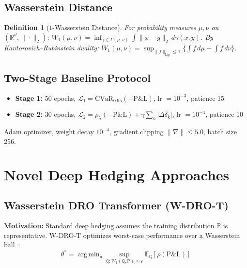 \documentclass[11pt]{article}
\newtheorem{definition}[theorem]{Definition}
\newcommand{\E}{\mathbb{E}}
\newcommand{\R}{\mathbb{R}}
\newcommand{\PP}{\mathbb{P}}
\newcommand{\QQ}{\mathbb{Q}}
\newcommand{\cvar}{\mathrm{CVaR}}
\DeclareMathOperator*{\argmin}{arg\,min}
\begin{document}
\subsection{Wasserstein Distance}

\begin{definition}[$1$-Wasserstein Distance]
For probability measures $\mu, \nu$ on $(\R^d, \|\cdot\|_2)$:
$W_1(\mu,\nu) = \inf_{\gamma \in \Gamma(\mu,\nu)} \int \|x-y\|_2\,d\gamma(x,y)$.
By Kantorovich--Rubinstein duality:
$W_1(\mu,\nu) = \sup_{\|f\|_{\mathrm{Lip}} \le 1}\{\int f\,d\mu - \int f\,d\nu\}$.
\end{definition}

\subsection{Two-Stage Baseline Protocol}

\begin{itemize}[noitemsep]
    \item \textbf{Stage 1:} 50 epochs, $\mathcal{L}_1 = \cvar_{0.95}(-\mathrm{P\&L})$, lr $= 10^{-3}$, patience 15
    \item \textbf{Stage 2:} 30 epochs, $\mathcal{L}_2 = \rho_\lambda(-\mathrm{P\&L}) + \gamma \sum_k |\Delta\delta_k|$, lr $= 10^{-4}$, patience 10
\end{itemize}
Adam optimizer, weight decay $10^{-4}$, gradient clipping $\|\nabla\| \leq 5.0$, batch size 256.

\section{Novel Deep Hedging Approaches}
\label{sec:approaches}

\subsection{Wasserstein DRO Transformer (W-DRO-T)}

\textbf{Motivation:} Standard deep hedging assumes the training distribution $\PP$ is representative. W-DRO-T optimizes worst-case performance over a Wasserstein ball~\citep{blanchet2019quantifying}:
\begin{equation}
    \theta^* = \argmin_\theta \sup_{\QQ: W_1(\QQ,\PP) \leq \varepsilon} \E_\QQ[\rho(\mathrm{P\&L})]
\end{equation}
\end{document}
